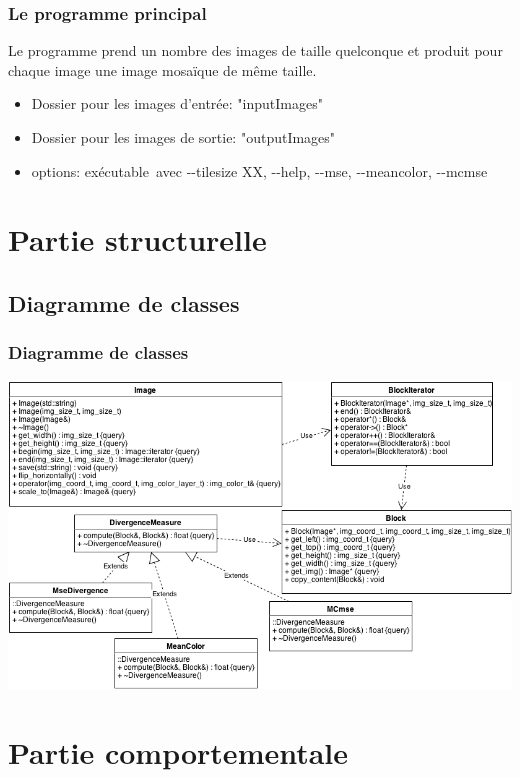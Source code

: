 \documentclass[handout]{beamer}
\newcommand{\tcb}{\color{blue}}
\begin{document}
\begin{frame}
\frametitle{\bf Le programme principal}
Le programme prend un nombre des images de taille quelconque et produit pour chaque image une image mosa\"{i}que de m\^eme taille.
\begin{itemize}
\item {\tcb Dossier pour les images d'entr\'ee}: "inputImages"
\item {\tcb Dossier pour les images de sortie}: "outputImages"

\item {\tcb options}: ex\'ecutable\ avec {-}{-}tilesize XX, {-}{-}help, {-}{-}mse, {-}{-}meancolor, {-}{-}mcmse

\end{itemize}

\end{frame}

\section{Partie structurelle}

\subsection{Diagramme de classes}

\begin{frame}

\frametitle{\bf Diagramme de classes}
\begin{center}
\includegraphics[width=\textwidth]{class_diagram.png}
\end{center}

\end{frame}

\section{Partie comportementale}
\end{document}
